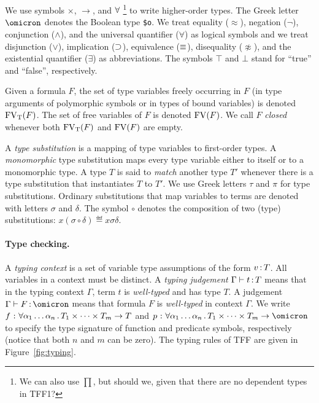 We use symbols ${\times}$, ${\to}$, and ${\forall}$%
\footnote{We can also use ${\prod}$, but should we,
given that there are no dependent types in TFF1?}
to write higher-order types. The Greek letter $\omicron$ denotes
the Boolean type {\tt \$o}. We treat equality ($\approx$),
negation ($\lnot$), conjunction ($\land$), and the universal
quantifier ($\forall$) as logical symbols and we treat
disjunction ($\lor$), implication ($\supset$), equivalence
($\equiv$), disequality ($\not\approx$), and the existential
quantifier ($\exists$) as abbreviations. The symbols
$\top$ and $\bot$ stand for ``true'' and ``false'',
respectively.

Given a formula $F$, the set of type variables
freely occurring in $F$ (in type arguments of
polymorphic symbols or in types of bound variables)
is denoted $\mathrm{FV}_\mathrm{T}(F)$. The set of free variables of $F$
is denoted $\mathrm{FV}(F)$. We call $F$ {\em closed\/}
whenever both $\mathrm{FV}_\mathrm{T}(F)$ and $\mathrm{FV}(F)$ are empty.

A {\em type substitution\/} is a mapping of type variables
to first-order types. A {\em monomorphic\/} type substitution
maps every type variable either to itself or to a monomorphic
type.
%
A type $T$ is said to {\em match\/} another
type $T'$ whenever there is a type substitution
that instantiates $T$ to $T'$.
We use Greek letters $\tau$ and $\pi$ for type
substitutions.
Ordinary substitutions that map variables to terms
are denoted with letters $\sigma$ and $\delta$.
The symbol $\circ$ denotes the composition
of two (type) substitutions:
$x(\sigma \circ \delta) \eqdef x\sigma\delta$.

\paragraph{Type checking.}
A {\em typing context\/} is a set of variable type assumptions
of the form $v \operatorname{:} T$.
All variables in a context must be distinct.
A {\em typing judgement\/} $\Gamma \vdash t \operatorname{:} T$ means
that in the typing context $\Gamma$, term $t$ is {\em well-typed\/}
and has type $T$. A judgement
$\Gamma \vdash F \ty \omicron$ means
that formula $F$ is {\em well-typed\/} in context $\Gamma$.
We write $f \,\operatorname{:}\, \forall \alpha_1\dots\alpha_n \,.\,
T_1 \times \dots \times T_m \to T$ and
$p \,\ty\, \forall \alpha_1\dots\alpha_n \,.\,
T_1 \times \dots \times T_m \to \omicron$ to specify the type
signature of function and predicate symbols, respectively
(notice that both $n$ and $m$ can be zero).
The typing rules of TFF are given in Figure~\ref{fig:typing}.

